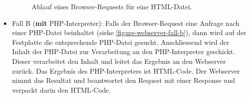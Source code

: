 \begin{itemize}
\begin{figure}[htb]
\caption{Ablauf eines Browser-Requests für eine \protect\acs{HTML}-Datei.}
\label{figure-webserver-fall-a}
\end{figure}
	
	\item Fall B (\textbf{mit} \ac{PHP}-Interpreter): Falls der Browser-Request eine Anfrage nach einer \ac{PHP}-Datei beinhaltet (siehe \autoref{figure-webserver-fall-b}), dann wird auf der Festplatte die entsprechende \ac{PHP}-Datei gesucht. Anschliessend wird der Inhalt der \ac{PHP}-Datei zur Verarbeitung an den \ac{PHP}-Interpreter geschickt. Dieser verarbeitet den Inhalt und leitet das Ergebnis an den Webserver zurück. Das Ergebnis des \ac{PHP}-Interpreters ist \ac{HTML}-Code. Der Webserver nimmt das Resultat und beantwortet den Request mit einer Response und verpackt darin den \ac{HTML}-Code.
\end{itemize}


